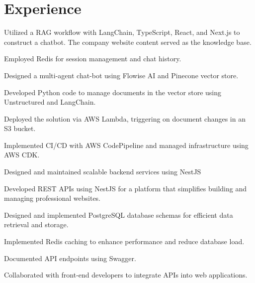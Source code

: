 \documentclass[letterpaper]{deedy-resume} %
\begin{document}
\begin{minipage}[t]{0.66\textwidth} %


\section{Experience}


\vspace{\topsep} %
\begin{tightitemize}
\item Utilized a RAG workflow with LangChain, TypeScript, React, and Next.js to construct a chatbot. The company website content served as the knowledge base.
\item Employed Redis for session management and chat history.
\item Designed a multi-agent chat-bot using Flowise AI and Pinecone vector store.
\item Developed Python code to manage documents in the vector store using Unstructured and LangChain.
\item Deployed the solution via AWS Lambda, triggering on document changes in an S3 bucket.
\item Implemented CI/CD with AWS CodePipeline and managed infrastructure using AWS CDK.
\item Designed and maintained scalable backend services using NestJS
\end{tightitemize}

\sectionspace %



\vspace{\topsep} %
\begin{tightitemize}
\item Developed REST APIs using NestJS for a platform that simplifies building and managing professional websites.
\item Designed and implemented PostgreSQL database schemas for efficient data retrieval and storage.
\item Implemented Redis caching to enhance performance and reduce database load.
\item Documented API endpoints using Swagger.
\item Collaborated with front-end developers to integrate APIs into web applications.
\end{tightitemize}


\end{minipage}
\end{document}
